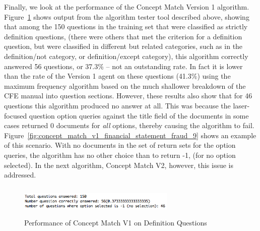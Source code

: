 Finally, we look at the performance of the Concept Match Version 1 algorithm.  Figure~\ref{fig:concept_match_v1_training_set_results_def} shows output from the algorithm tester tool described above, showing that among the 150 questions in the training set that were classified as strictly definition questions, (there were others that met the criterion for a definition question, but were classified in different but related categories, such as in the definition/not category, or definition/except category), this algorithm correctly answered 56 questions, or 37.3\% -- not an outstanding rate.  In fact it is lower than the rate of the Version 1 agent on these questions (41.3\%) using the maximum frequency algorithm based on the much shallower breakdown of the CFE manual into question sections.  However, these results also show that for 46 questions this algorithm produced no answer at all.  This was because the laser-focused question option queries against the title field of the documents in some cases returned 0 documents for \emph{all} options, thereby causing the algorithm to fail.  Figure~\ref{fig:concept_match_v1_financial_statement_fraud_9} shows an example of this scenario.  With no documents in the set of return sets for the option queries, the algorithm has no other choice than to return -1, (for no option selected).  In the next algorithm, Concept Match V2, however, this issue is addressed.


\begin{figure}
\centering
\vspace{1.0in}
\includegraphics[width=75mm, height=15mm]{concept_match_v1_training_set_results_def.png}
\caption{Performance of Concept Match V1 on Definition Questions}
\label{fig:concept_match_v1_training_set_results_def}
\end{figure}

